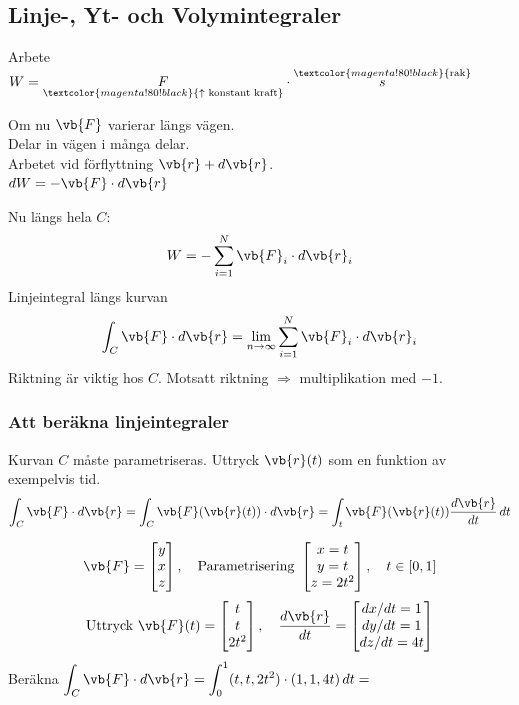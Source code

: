 \subsection{Linje-, Yt- och Volymintegraler}

Arbete $W = \underset{\textcolor{magenta!80!black}{\uparrow \text{ konstant kraft}}}{F} \cdot \overset{\textcolor{magenta!80!black}{\text{rak}}}{s}$

\begin{minipage}{0.6\linewidth}
Om nu $\vb{F}$ varierar längs vägen.\\
Delar in vägen i många delar.\\
Arbetet vid förflyttning $\vb{r} + d\vb{r}$.\\
$dW = -\vb{F} \cdot d\vb{r}$
\end{minipage}
\begin{minipage}{0.38\linewidth}
\end{minipage}

Nu längs hela $C$:
\[ W = -\sum_{i=1}^N \vb{F}_i \cdot d\vb{r}_i \]
Linjeintegral längs kurvan
\[ \int_C \vb{F} \cdot d\vb{r} = \lim_{n \to \infty} \sum_{i=1}^N \vb{F}_i \cdot d\vb{r}_i \]
Riktning är viktig hos $C$. Motsatt riktning $\Rightarrow$ multiplikation med $-1$.

\subsubsection*{Att beräkna linjeintegraler}
Kurvan $C$ måste parametriseras. Uttryck $\vb{r}(t)$ som en funktion av exempelvis tid.
\[ \int_C \vb{F} \cdot d\vb{r} = \int_C \vb{F}(\vb{r}(t)) \cdot d\vb{r} = \int_t \vb{F}(\vb{r}(t))\frac{d\vb{r}}{dt}\,dt \]

\begin{example}
\[ \vb{F} = \begin{bmatrix} y \\ x \\ z \end{bmatrix}, \quad \text{Parametrisering } \begin{bmatrix} x = t \\ y = t \\ z = 2t^2 \end{bmatrix}, \quad t \in [0, 1] \]
\[ \text{Uttryck } \vb{F}(t) = \begin{bmatrix} t \\ t \\ 2t^2 \end{bmatrix}, \quad \frac{d\vb{r}}{dt} = \begin{bmatrix} dx/dt = 1 \\ dy/dt = 1 \\ dz/dt = 4t \end{bmatrix} \]
Beräkna $\displaystyle\int_C \vb{F} \cdot d\vb{r} = \int_0^1 (t, t, 2t^2) \cdot (1, 1, 4t)\,dt =$
\end{example}
